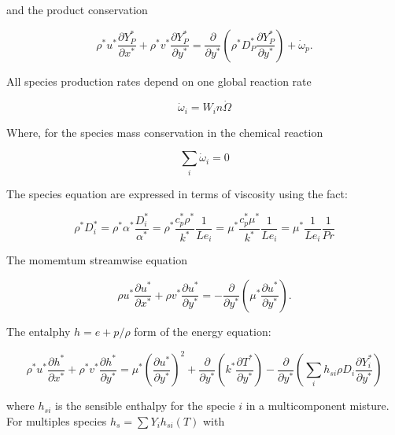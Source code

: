 and the product conservation 

\begin{equation} 
\rho^* u^*\frac{\partial Y_{P}^*}{\partial x^*}+
\rho^* v^*\frac{\partial Y_{P}^*}{\partial y^*}
=
\frac{\partial}{\partial y^*}
\left(\rho^* D_{P}^{*}\frac{\partial Y_P^{*}}{\partial y^{*}}\right)
+
\dot{\omega}_p
.
\end{equation} 

All species production rates depend on one global reaction rate

\begin{equation}
    \dot{\omega}_i=W_i n \dot{\Omega}
\end{equation}

Where, for the species mass conservation in the chemical reaction  

\begin{equation}
\sum_i\dot{\omega}_i=0
\end{equation}

The species equation are expressed in terms of viscosity 
using  the fact:

\begin{equation}
    \rho^*D_i^{*}
    =
    \rho^*\alpha^{*}\frac{D_i^{*}}{\alpha^{*}}
    =
    \rho^*\frac{c_p^*\rho^*}{k^*}\frac{1}{Le_i}
    =
    \mu^*\frac{c_p^*\mu^*}{k^*}\frac{1}{Le_i}
    =
    \mu^*
    \frac{1}{Le_i}
    \frac{1}{Pr}
\end{equation}

The momemtum streamwise equation 

\begin{equation} 
\rho u^*\frac{\partial u^*}{\partial x^*}+
\rho v^*\frac{\partial u^*}{\partial y^*}=-
\frac{\partial}{\partial y^*}
\left(\mu^*\frac{\partial u^*}{\partial y^*}\right)
.
\end{equation} 

The entalphy $h=e+p/\rho$ form of the energy equation:

\begin{equation}
\rho^* u^* \frac{\partial h^*}{\partial x^*}+
\rho^* v^* \frac{\partial h^*}{\partial y^*}
=
\mu^*
\left(
\frac{\partial u^*}{\partial y^*}
\right)^2
+
\frac{\partial}{\partial y^*}
\left(
    k^*\frac{\partial T^*}{\partial y^*}
\right)
-
\frac{\partial}{\partial y^*}
\left(
        \sum_i
        h_{si}
        \rho 
        D_i
        \frac{\partial Y_i^*}{\partial y^*}
\right)
\end{equation} 


where $h_{si}$ is the sensible enthalpy 
for the specie $i$ in a multicomponent misture.  
For multiples species $h_s=\sum Y_ih_{si}(T)$
with  

